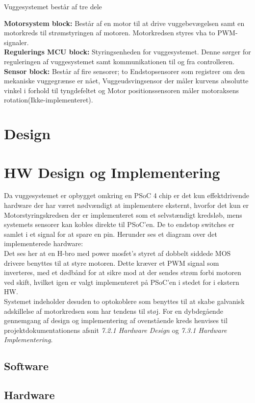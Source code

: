 
Vuggesystemet består af tre dele

\textbf{Motorsystem block:} Består af en motor til at drive vuggebevægelsen samt en motorkreds til strømstyringen af motoren. Motorkredsen styres vha to PWM-signaler.\\
\textbf{Regulerings MCU block:} Styringsenheden for vuggesystemet. Denne sørger for reguleringen af vuggesystemet samt kommunikationen til og fra controlleren.\\
\textbf{Sensor block:} Består af fire sensorer; to Endstopsensorer som registrer om den mekaniske vuggegrænse er nået, Vuggeudsvingsensor der måler kurvens absolutte vinkel i forhold til tyngdefeltet og Motor positionssensoren måler motoraksens rotation(Ikke-implementeret).



\section{Design}
\label{vs_design}





\section{HW Design og Implementering}
\label{vs_HW}
Da vuggesystemet er opbygget omkring en PSoC 4 chip er det kun effektdrivende hardware der har været nødvændigt at implementere eksternt, hvorfor det kun er Motorstyringskredsen der er implementeret som et selvstændigt kredsløb, mens systemets sensorer kan kobles direkte til PSoC'en. De to endstop switches er samlet i et signal for at spare en pin. Herunder ses et diagram over det implementerede hardware:\\
Det ses her at en H-bro med power mosfet's styret af dobbelt siddede MOS drivere benyttes til at styre motoren. Dette kræver et PWM signal som inverteres, med et dødbånd for at sikre mod at der sendes strøm forbi motoren ved skift, hvilket igen er valgt implementeret på PSoC'en i stedet for i ekstern HW. \\ Systemet indeholder desuden to optokoblere som benyttes til at skabe galvanisk adskillelse af motorkredsen som har tendens til støj.
For en dybdegående gennemgang af design og implementering af ovenstående kreds henvises til projektdokumentationens afsnit \textit{7.2.1 Hardware Design} og \textit{7.3.1 Hardware Implementering}.\\



\subsection*{Software}
\label{vs_implementering_sw}


\subsection*{Hardware}
\label{vs_implementering_hw}

